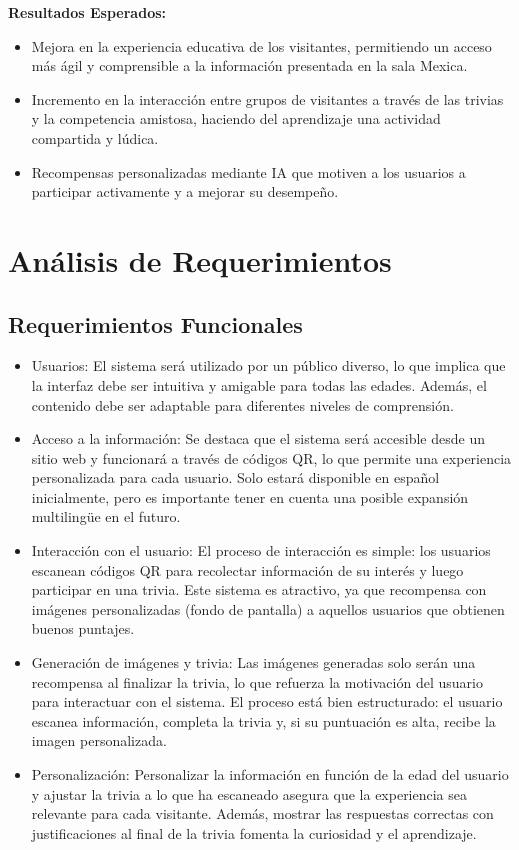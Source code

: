 \documentclass{report}
\begin{document}
    \textbf{Resultados Esperados:}
    \begin{itemize}
        \item Mejora en la experiencia educativa de los visitantes, permitiendo un acceso más ágil y comprensible a la información presentada en la sala Mexica.
        \item Incremento en la interacción entre grupos de visitantes a través de las trivias y la competencia amistosa, haciendo del aprendizaje una actividad compartida y lúdica.
        \item Recompensas personalizadas mediante IA que motiven a los usuarios a participar activamente y a mejorar su desempeño.
    \end{itemize}

    \newpage

    \section{Análisis de Requerimientos}
    \subsection*{Requerimientos Funcionales}
    \begin{itemize}
        \item Usuarios: El sistema será utilizado por un público diverso, lo que implica que la interfaz debe ser intuitiva y amigable para todas las edades. Además, el contenido debe ser adaptable para diferentes niveles de comprensión.
        \item Acceso a la información: Se destaca que el sistema será accesible desde un sitio web y funcionará a través de códigos QR, lo que permite una experiencia personalizada para cada usuario. Solo estará disponible en español inicialmente, pero es importante tener en cuenta una posible expansión multilingüe en el futuro.
        \item Interacción con el usuario: El proceso de interacción es simple: los usuarios escanean códigos QR para recolectar información de su interés y luego participar en una trivia. Este sistema es atractivo, ya que recompensa con imágenes personalizadas (fondo de pantalla) a aquellos usuarios que obtienen buenos puntajes.
        \item Generación de imágenes y trivia: Las imágenes generadas solo serán una recompensa al finalizar la trivia, lo que refuerza la motivación del usuario para interactuar con el sistema. El proceso está bien estructurado: el usuario escanea información, completa la trivia y, si su puntuación es alta, recibe la imagen personalizada.
        \item Personalización: Personalizar la información en función de la edad del usuario y ajustar la trivia a lo que ha escaneado asegura que la experiencia sea relevante para cada visitante. Además, mostrar las respuestas correctas con justificaciones al final de la trivia fomenta la curiosidad y el aprendizaje.
    \end{itemize}
\end{document}

